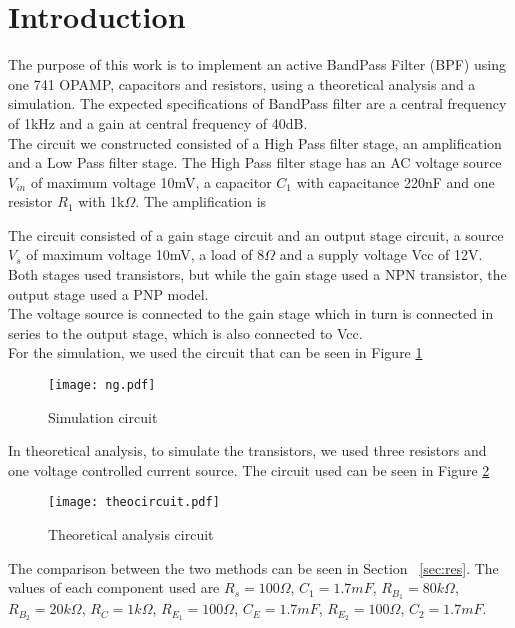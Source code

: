 \section{Introduction}
\label{sec:intro}
The purpose of this work is to implement an active BandPass Filter (BPF) using one 741 OPAMP, capacitors and resistors, using a theoretical analysis and a simulation. The expected specifications of BandPass filter are a central frequency of 1kHz and a gain at central frequency of 40dB.\\
The circuit we constructed consisted of a High Pass filter stage, an amplification and a Low Pass filter stage. The High Pass filter stage has an AC voltage source $V_{in}$ of maximum voltage 10mV, a capacitor $C_1$ with capacitance 220nF and one resistor $R_1$ with 1k$\Omega$. The amplification is 


 The circuit consisted of a gain stage circuit and an output stage circuit, a source $V_s$ of maximum voltage 10mV, a load of 8$\Omega$ and a supply voltage Vcc of 12V. Both stages used transistors, but while the gain stage used a NPN transistor, the output stage used a PNP model.\\
The voltage source is connected to the gain stage which in turn is connected in series to the output stage, which is also connected to Vcc.\\
For the simulation, we used the circuit that can be seen in Figure \ref{fig:circngspice}
\begin{figure}[H] \centering
\texttt{[image: ng.pdf]}
\caption{Simulation circuit}
\label{fig:circngspice}
\end{figure} 
In theoretical analysis, to simulate the transistors, we used three resistors and one voltage controlled current source. The circuit used can be seen in Figure \ref{fig:circoc}

\begin{figure}[H] \centering
\texttt{[image: theocircuit.pdf]}
\caption{Theoretical analysis circuit}
\label{fig:circoc}
\end{figure} 
The comparison between the two methods can be seen in Section ~\ref{sec:res}.
The values of each component used are $R_s=100\Omega$, $C_1=1.7 mF$, $R_{B_1}=80k\Omega$, $R_{B_2}=20k\Omega$, $R_C=1k\Omega$, $R_{E_1}=100\Omega$, $C_E=1.7 mF$, $R_{E_2}=100\Omega$, $C_{2}=1.7mF$.